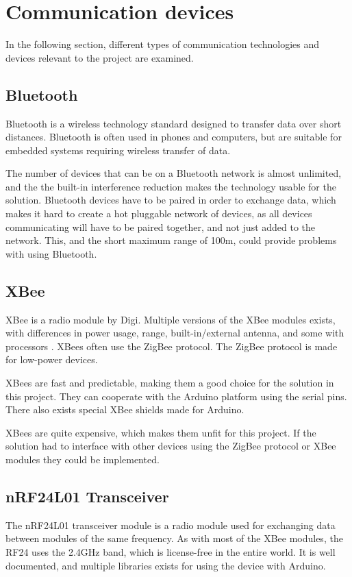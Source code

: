 \section{Communication devices}
In the following section, different types of communication technologies and devices relevant to the project are examined.

\subsection{Bluetooth}
Bluetooth is a wireless technology standard designed to transfer data over short distances\cite{bluetoothbasics}. Bluetooth is often used in phones and computers, but are suitable for embedded systems requiring wireless transfer of data.

The number of devices that can be on a Bluetooth network is almost unlimited, and the the built-in interference reduction makes the technology usable for the solution\cite{bluetoothbasics}.
Bluetooth devices have to be paired in order to exchange data, which makes it hard to create a hot pluggable network of devices, as all devices communicating will have to be paired together, and not just added to the network. 
This, and the short maximum range of 100m\cite{bluetoothbasics}, could provide problems with using Bluetooth.

\subsection{XBee}
XBee is a radio module by Digi. Multiple versions of the XBee modules exists, with differences in power usage, range, built-in/external antenna, and some with processors \cite{sparkfunXbeeGuide}.
XBees often use the ZigBee protocol. The ZigBee protocol is made for low-power devices\cite{zigbee}.

XBees are fast and predictable, making them a good choice for the solution in this project. They can cooperate with the Arduino platform using the serial pins. There also exists special XBee shields made for Arduino.

XBees are quite expensive, which makes them unfit for this project. If the solution had to interface with other devices using the ZigBee protocol or XBee modules they could be implemented.

\subsection{nRF24L01 Transceiver}
The nRF24L01 transceiver module is a radio module used for exchanging data between modules of the same frequency. As with most of the XBee modules, the RF24 uses the 2.4GHz band, which is license-free in the entire world\cite{itubands}. It is well documented, and multiple libraries exists for using the device with Arduino.

